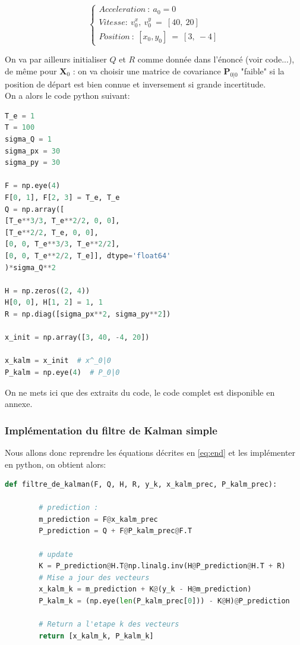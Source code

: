 \begin{equation*}
	\begin{cases}
		Accele ration\ :\ a_{0} =0\\
		Vitesse:\ v_{0}^{x} ,\ v_{0}^{y} \ =\ [ 40,\ 20]\\
		Position\ :\ [ x_{0} ,y_{0}] \ =\ [ 3,\ -4]
	\end{cases}
\end{equation*}

On va par ailleurs initialiser $Q$ et $R$ comme donnée dans l'énoncé (voir code...), de même pour $\mathbf{X}_{0}$ : on va choisir une matrice de covariance $\mathbf{P}_{0|0}$ "faible" si la position de départ est bien connue et inversement si grande incertitude.\\
On a alors le code python suivant:
\begin{lstlisting}[language=Python, caption=Fonction de calcul du filtre de kalman à l'instant k]
T_e = 1
T = 100
sigma_Q = 1
sigma_px = 30
sigma_py = 30

F = np.eye(4)
F[0, 1], F[2, 3] = T_e, T_e
Q = np.array([
[T_e**3/3, T_e**2/2, 0, 0],
[T_e**2/2, T_e, 0, 0],
[0, 0, T_e**3/3, T_e**2/2],
[0, 0, T_e**2/2, T_e]], dtype='float64'
)*sigma_Q**2

H = np.zeros((2, 4))
H[0, 0], H[1, 2] = 1, 1
R = np.diag([sigma_px**2, sigma_py**2])

x_init = np.array([3, 40, -4, 20])

x_kalm = x_init  # x^_0|0
P_kalm = np.eye(4)  # P_0|0
\end{lstlisting}

On ne mets ici que des extraits du code, le code complet est disponible en annexe.

\newpage

\subsubsection{Implémentation du filtre de Kalman simple}

Nous allons donc reprendre les équations décrites en \ref{eq:end} et les implémenter en python, on obtient alors:
\begin{lstlisting}[language=Python, caption=Fonction de calcul du filtre de kalman à l'instant k]
		def filtre_de_kalman(F, Q, H, R, y_k, x_kalm_prec, P_kalm_prec):
		
		# prediction :
		m_prediction = F@x_kalm_prec
		P_prediction = Q + F@P_kalm_prec@F.T
		
		# update
		K = P_prediction@H.T@np.linalg.inv(H@P_prediction@H.T + R)
		# Mise a jour des vecteurs
		x_kalm_k = m_prediction + K@(y_k - H@m_prediction)
		P_kalm_k = (np.eye(len(P_kalm_prec[0])) - K@H)@P_prediction
		
		# Return a l'etape k des vecteurs
		return [x_kalm_k, P_kalm_k]
\end{lstlisting}

